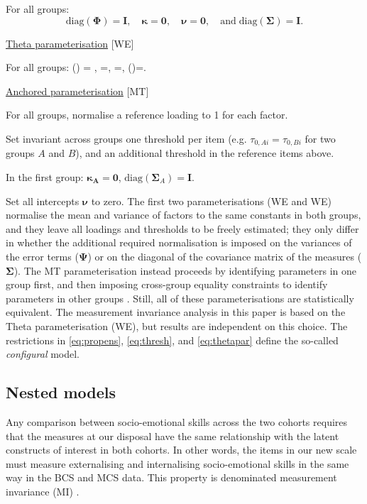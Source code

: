 For all groups: $$\text{diag}(\bm{\Phi}) = \bm{I}, \quad \bm{\kappa}=\bm{0}, \quad \bm{\nu}=\bm{0}, \quad \text{and} \; \text{diag}(\bm{\Sigma})=\bm{I}.$$

\item \underline{Theta parameterisation} {[WE{\textTheta}]} \citep{Wu2016a}

For all groups: 
\be\label{eq:thetapar}
(\bm{\Phi}) = , \quad \bm{\kappa}=, \quad \bm{\nu}=, \quad {} \; (\bm{\Psi})=.
\ee

\item \underline{Anchored parameterisation} {[MT]} \citep{Millsap2004}
  \bi
  \item For all groups, normalise a reference loading to 1 for each factor.
  \item Set invariant across groups one threshold per item (e.g. $\tau_{0,Ai} = \tau_{0,Bi}$ for two groups $A$ and $B$), and an additional threshold in the reference items above.
  \item In the first group: $\bm{\kappa_A}=\bm{0}$, $\text{diag}(\bm{\Sigma}_A)=\bm{I}$.
  \item Set all intercepts $\bm{\nu}$ to zero.
  \ei
\ei
The first two parameterisations (WE{\textDelta} and WE{\textTheta}) normalise the mean and variance of factors to the same constants in both groups, and they leave all loadings and thresholds to be freely estimated; they only differ in whether the additional required normalisation is imposed on the variances of the error terms ($\bm{\Psi}$) or on the diagonal of the covariance matrix of the measures ($\bm{\Sigma}$). The MT parameterisation instead proceeds by identifying parameters in one group first, and then imposing cross-group equality constraints to identify parameters in other groups \citep{Wu2016a}. Still, all of these parameterisations are statistically equivalent. The measurement invariance analysis in this paper is based on the Theta parameterisation (WE{\textTheta}), but results are independent on this choice. The restrictions in \eqref{eq:propens}, \eqref{eq:thresh}, and \eqref{eq:thetapar} define the so-called \emph{configural} model.

\subsection{Nested models \label{sec:nested}}

Any comparison between socio-emotional skills across the two cohorts requires that the measures at our disposal have the same relationship with the latent constructs of interest in both cohorts. In other words, the items in our new scale must measure externalising and internalising socio-emotional skills in the same way in the BCS and MCS data. This property is denominated measurement invariance (MI) \citep{Vandenberg2000a,Putnick2016}.

